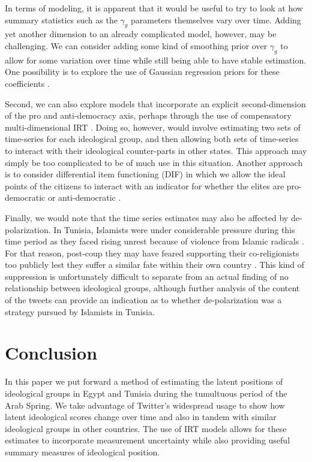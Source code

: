 \documentclass[12pt]{article}
\begin{document}
In terms of modeling, it is apparent that it would be useful to try to look at how summary statistics such as the $\gamma_g$ parameters themselves vary over time. Adding yet another dimension to an already complicated model, however, may be challenging. We can consider adding some kind of smoothing prior over $\gamma_g$ to allow for some variation over time while still being able to have stable estimation. One possibility is to explore the use of Gaussian regression priors for these coefficients \parencite{rasmussen2006}.

Second, we can also explore models that incorporate an explicit second-dimension of the pro and anti-democracy axis, perhaps through the use of compensatory multi-dimensional IRT \parencite{reckase2009}. Doing so, however, would involve estimating two sets of time-series for each ideological group, and then allowing both sets of time-series to interact with their ideological counter-parts in other states. This approach may simply be too complicated to be of much use in this situation. Another approach is to consider differential item functioning (DIF) in which we allow the ideal points of the citizens to interact with an indicator for whether the elites are pro-democratic or anti-democratic \parencite{jackman2004}. 

Finally, we would note that the time series estimates may also be affected by de-polarization. In Tunisia, Islamists were under considerable pressure during this time period as they faced rising unrest because of violence from Islamic radicals \parencite{mccarthy2016}. For that reason, post-coup they may have feared supporting their co-religionists too publicly lest they suffer a similar fate within their own country \parencite{grewal2016}. This kind of suppression is unfortunately difficult to separate from an actual finding of no relationship between ideological groups, although further analysis of the content of the tweets can provide an indication as to whether de-polarization was a strategy pursued by Islamists in Tunisia.

\section*{Conclusion}

In this paper we put forward a method of estimating the latent positions of ideological groups in Egypt and Tunisia during the tumultuous period of the Arab Spring. We take advantage of Twitter's widespread usage to show how latent ideological scores change over time and also in tandem with similar ideological groups in other countries. The use of IRT models allows for these estimates to incorporate measurement uncertainty while also providing useful summary measures of ideological position.
\end{document}
